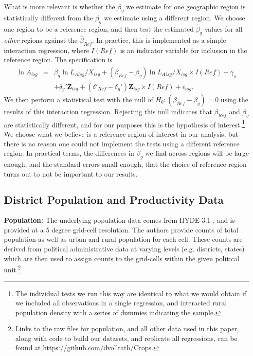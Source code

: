 \documentclass[11pt]{article}
\begin{document}
What is more relevant is whether the $\beta_g$ we estimate for one geographic region is statistically different from the $\beta_g$ we estimate using a different region. We choose one region to be a reference region, and then test the estimated $\hat{\beta}_g$ values for all \textit{other} regions against the $\hat{\beta}_{Ref}$. In practice, this is implemented as a simple interaction regression, where $I(Ref)$ is an indicator variable for inclusion in the reference region. The specification is
\begin{eqnarray}
    \ln A_{isg} &=& \beta_g \ln L_{Aisg}/X_{isg} + (\beta_{Ref} - \beta_g) \ln L_{Aisg}/X_{isg} \times I(Ref) + \gamma_{s} \\ \nonumber
     && + \delta_g' \mathbf{Z}_{isg} + (\delta'_{Ref} - \delta_g') \mathbf{Z}_{isg} \times I(Ref) + \epsilon_{isg}. \label{EQ_interaction}
\end{eqnarray}
We then perform a statistical test with the null of $H_0: (\beta_{Ref} - \beta_g) = 0$ using the results of this interaction regression. Rejecting this null indicates that $\beta_{Ref}$ and $\beta_g$ are statistically different, and for our purposes this is the hypothesis of interest.\footnote{The individual tests we run this way are identical to what we would obtain if we included all observations in a single regression, and interacted rural population density with a series of dummies indicating the sample.} We choose what we believe is a reference region of interest in our analysis, but there is no reason one could not implement the tests using a different reference region. In practical terms, the differences in $\beta_g$ we find across regions will be large enough, and the standard errors small enough, that the choice of reference region turns out to not be important to our results. 

\subsection{District Population and Productivity Data}

\noindent\textbf{Population:} The underlying population data comes from HYDE 3.1 \citep{hyde31}, and is provided at a 5 degree grid-cell resolution. The authors provide counts of total population as well as urban and rural population for each cell. These counts are derived from political administrative data at varying levels (e.g. districts, states) which are then used to assign counts to the grid-cells within the given political unit.\footnote{Links to the raw files for population, and all other data used in this paper, along with code to build our datasets, and replicate all regressions, can be found at https://github.com/dvollrath/Crops.}
\end{document}
